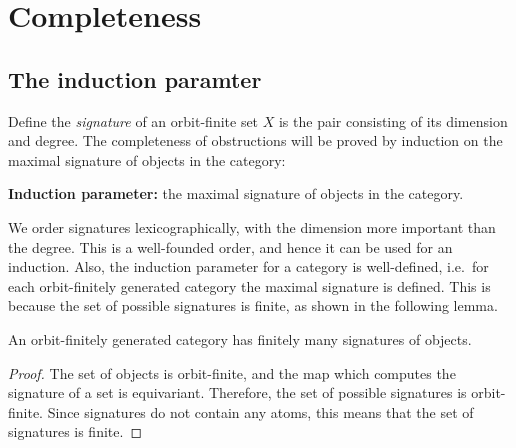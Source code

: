 \section{Completeness}
\label{sec:completeness-of-obstructions}

\subsection{The induction paramter}
\label{sec:induction-parameter}
Define the  \emph{signature} of an orbit-finite set $X$ is the pair consisting of its dimension and degree. The completeness of obstructions will be proved by induction on the maximal signature of objects in the category: 
\begin{center}
    \textbf{Induction parameter:} the maximal signature of objects in the category.
\end{center}

 We order signatures lexicographically, with the dimension more important than the degree. This is a well-founded order, and hence it can be used for an induction.  Also, the induction  parameter for a category  is well-defined, i.e.~for each orbit-finitely generated category the maximal signature is defined. This is because the set 
of possible signatures is finite, as shown in the following lemma.

\begin{lemma}
    An orbit-finitely generated category has finitely many signatures of objects.
\end{lemma}
\begin{proof}
The set of objects is orbit-finite, and the map which computes the signature of a set is equivariant. Therefore, the set of possible signatures is orbit-finite. Since signatures do not contain any atoms, this means that the set of signatures is finite.    
\end{proof}






